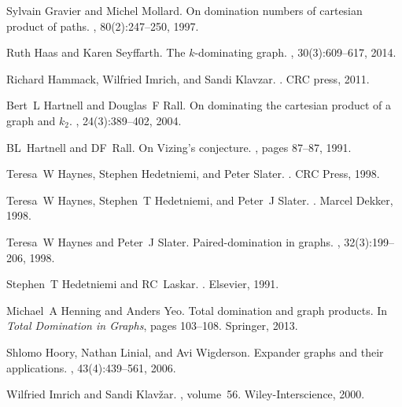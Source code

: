 \documentclass[A4,12pt]{article}
\theoremstyle{definition}
\theoremstyle{remark}
\begin{document}
\begin{thebibliography}{10}
	Sylvain Gravier and Michel Mollard.
	\newblock On domination numbers of cartesian product of paths.
	, 80(2):247--250, 1997.
	
	Ruth Haas and Karen Seyffarth.
	\newblock The $k$-dominating graph.
	, 30(3):609--617, 2014.
	
	Richard Hammack, Wilfried Imrich, and Sandi Klavzar.
	.
	\newblock CRC press, 2011.
	
	Bert~L Hartnell and Douglas~F Rall.
	\newblock On dominating the cartesian product of a graph and $k_2$.
	, 24(3):389--402, 2004.
	
	BL~Hartnell and DF~Rall.
	\newblock On Vizing's conjecture.
	, pages 87--87, 1991.
	
	Teresa~W Haynes, Stephen Hedetniemi, and Peter Slater.
	.
	\newblock CRC Press, 1998.
	
	Teresa~W Haynes, Stephen~T Hedetniemi, and Peter~J Slater.
	.
	\newblock Marcel Dekker, 1998.
	
	Teresa~W Haynes and Peter~J Slater.
	\newblock Paired-domination in graphs.
	, 32(3):199--206, 1998.
	
	Stephen~T Hedetniemi and RC~Laskar.
	.
	\newblock Elsevier, 1991.
	
	Michael~A Henning and Anders Yeo.
	\newblock Total domination and graph products.
	\newblock In {\em Total Domination in Graphs}, pages 103--108. Springer, 2013.
	
	Shlomo Hoory, Nathan Linial, and Avi Wigderson.
	\newblock Expander graphs and their applications.
	, 43(4):439--561,
	2006.
	
	Wilfried Imrich and Sandi Klav{\v{z}}ar.
	, volume~56.
	\newblock Wiley-Interscience, 2000.
	

\end{thebibliography}
\end{document}
